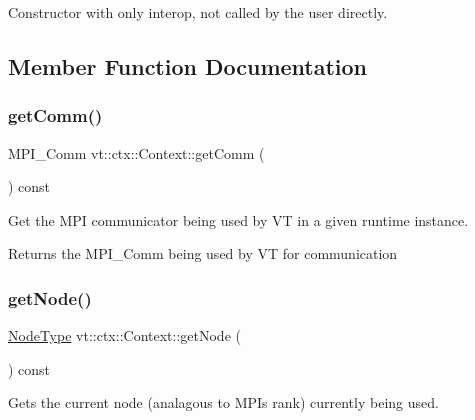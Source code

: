 Constructor with only interop, not called by the user directly. 



\subsection{Member Function Documentation}
\mbox{\label{structvt_1_1ctx_1_1_context_a2d4378c97824792991a3410449cf19db}} 
\subsubsection{\texorpdfstring{get\+Comm()}{getComm()}}
{\footnotesize\ttfamily M\+P\+I\+\_\+\+Comm vt\+::ctx\+::\+Context\+::get\+Comm (\begin{DoxyParamCaption}{ }\end{DoxyParamCaption}) const\hspace{0.3cm}{\ttfamily [inline]}}



Get the M\+PI communicator being used by VT in a given runtime instance. 

\begin{DoxyReturn}{Returns}
the {\ttfamily M\+P\+I\+\_\+\+Comm} being used by VT for communication 
\end{DoxyReturn}
\mbox{\label{structvt_1_1ctx_1_1_context_a0d52c263ce8516546a67443d9a86fa5f}} 
\subsubsection{\texorpdfstring{get\+Node()}{getNode()}}
{\footnotesize\ttfamily \hyperlink{namespacevt_a866da9d0efc19c0a1ce79e9e492f47e2}{Node\+Type} vt\+::ctx\+::\+Context\+::get\+Node (\begin{DoxyParamCaption}{ }\end{DoxyParamCaption}) const\hspace{0.3cm}{\ttfamily [inline]}}



Gets the current node (analagous to M\+PI\textquotesingle{}s rank) currently being used. 

